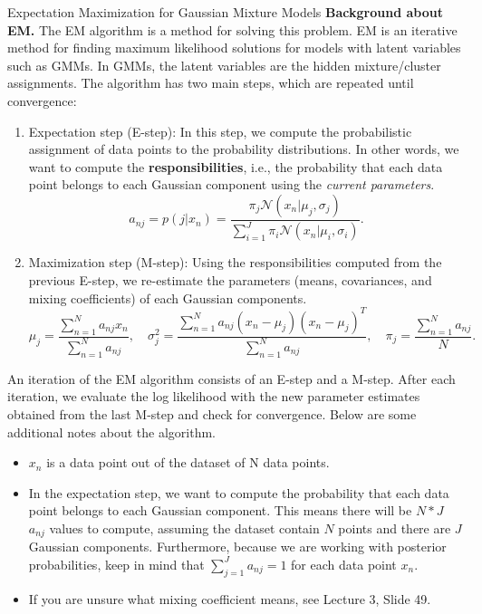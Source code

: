 \documentclass[
	english,
        solution=true
	]{tudaexercise}
\begin{document}
\begin{task}[points=6 + 4]{Expectation Maximization for Gaussian Mixture Models}
\textbf{Background about EM.}
The EM algorithm is a method for solving this problem. EM is an iterative method for finding maximum likelihood solutions for models with latent variables such as GMMs. In GMMs, the latent variables are the hidden mixture/cluster assignments. The algorithm has two main steps, which are repeated until convergence:
\begin{enumerate}
    \item Expectation step (E-step): In this step, we compute the probabilistic assignment of data points to the probability distributions. In other words, we want to compute the \textbf{responsibilities}, i.e., the probability that each data point belongs to each Gaussian component using the \textit{current parameters}.
    \begin{equation*}
    a_{nj} = p(j|x_n) = \frac{ \pi_j \mathcal{N}(x_n  | \mu_j, \sigma_j) }
                                { \sum_{i=1}^J \pi_i \mathcal{N}(x_n | \mu_i, \sigma_i) }.
    \end{equation*}
    \item Maximization step (M-step): Using the responsibilities computed from the previous E-step, we re-estimate the parameters (means, covariances, and mixing coefficients) of each Gaussian components. 
    \begin{equation*}
    \mu_j = \frac{ \sum_{n=1}^N a_{nj}x_n } { \sum_{n=1}^N a_{nj} }, \quad
    \sigma_j^2 = \frac{ \sum_{n=1}^N a_{nj}(x_n-\mu_j)(x_n-\mu_j)^T } { \sum_{n=1}^N a_{nj} },
    \quad \pi_j = \frac{ \sum_{n=1}^N a_{nj} } {N }.
    \end{equation*}
\end{enumerate}
An iteration of the EM algorithm consists of an E-step and a M-step. After each iteration, we evaluate the log likelihood with the new parameter estimates obtained from the last M-step and check for convergence. Below are some additional notes about the algorithm.
\begin{itemize}
    \item $x_n$ is a data point out of the dataset of N data points.
    \item In the expectation step, we want to compute the probability that each data point belongs to each Gaussian component. This means there will be $N*J$ $a_{nj}$ values to compute, assuming the dataset contain $N$ points and there are $J$ Gaussian components. Furthermore, because we are working with posterior probabilities, keep in mind that $ \sum_{j=1}^J a_{nj} = 1$ for each data point $x_n$.
    \item If you are unsure what mixing coefficient means, see Lecture 3, Slide 49.

\end{itemize}
\end{task}
\end{document}
